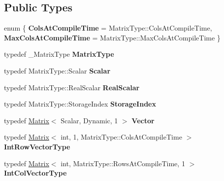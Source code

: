 \subsection*{Public Types}
\begin{DoxyCompactItemize}
\item 
\mbox{\label{class_eigen_1_1_super_l_u_base_a2416352e90cf1495595aaa6fe9d79117}} 
enum \{ {\bfseries Cols\+At\+Compile\+Time} = Matrix\+Type\+::Cols\+At\+Compile\+Time, 
{\bfseries Max\+Cols\+At\+Compile\+Time} = Matrix\+Type\+::Max\+Cols\+At\+Compile\+Time
 \}
\item 
\mbox{\label{class_eigen_1_1_super_l_u_base_a41cb4cb4e8a548b9112c3f3cdba4782e}} 
typedef \+\_\+\+Matrix\+Type {\bfseries Matrix\+Type}
\item 
\mbox{\label{class_eigen_1_1_super_l_u_base_a4d2c46083f0f2167e36a02de2e7fd4d1}} 
typedef Matrix\+Type\+::\+Scalar {\bfseries Scalar}
\item 
\mbox{\label{class_eigen_1_1_super_l_u_base_ad8e16b5721aa493c0093862f58d3de0e}} 
typedef Matrix\+Type\+::\+Real\+Scalar {\bfseries Real\+Scalar}
\item 
\mbox{\label{class_eigen_1_1_super_l_u_base_a2b9a744f9d881b6c98dc3c975da11e2f}} 
typedef Matrix\+Type\+::\+Storage\+Index {\bfseries Storage\+Index}
\item 
\mbox{\label{class_eigen_1_1_super_l_u_base_a0b9fae173ef6689999ae774c8c2707f7}} 
typedef \mbox{\hyperlink{class_eigen_1_1_matrix}{Matrix}}$<$ Scalar, Dynamic, 1 $>$ {\bfseries Vector}
\item 
\mbox{\label{class_eigen_1_1_super_l_u_base_af42c2a35e69ded5dd96bbff3adf519d5}} 
typedef \mbox{\hyperlink{class_eigen_1_1_matrix}{Matrix}}$<$ int, 1, Matrix\+Type\+::\+Cols\+At\+Compile\+Time $>$ {\bfseries Int\+Row\+Vector\+Type}
\item 
\mbox{\label{class_eigen_1_1_super_l_u_base_a4437863f63481a5a8cc9ae8a5566922b}} 
typedef \mbox{\hyperlink{class_eigen_1_1_matrix}{Matrix}}$<$ int, Matrix\+Type\+::\+Rows\+At\+Compile\+Time, 1 $>$ {\bfseries Int\+Col\+Vector\+Type}

\end{DoxyCompactItemize}
